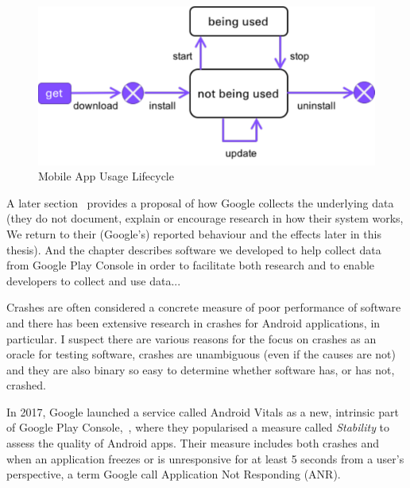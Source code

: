 
\begin{figure}
    \includegraphics[width=\linewidth]{images/mobile_app_usage_lifecycle.pdf}
    \caption{Mobile App Usage Lifecycle}
    \label{fig:mobile_app_usage_lifecycle}
\end{figure}

A later section~\href{sec:platform-level-analytics}{\emph{}} provides a proposal of how Google collects the underlying data (they do not document, explain or encourage research in how their system works, We return to their (Google's) reported behaviour and the effects later in this thesis). %
And the chapter \href{app:software-contributions}{\emph{}} describes software we developed to help collect data from Google Play Console in order to facilitate both research and to enable developers to collect and use data...

Crashes are often considered a concrete measure of poor performance of software and there has been extensive research in crashes for Android applications, in particular. I suspect there are various reasons for the focus on crashes as an oracle for testing software, crashes are unambiguous (even if the causes are not) and they are also binary so easy to determine whether software has, or has not, crashed. 

In 2017, Google launched a service called Android Vitals as a new, intrinsic part of Google Play Console,~, where they popularised a measure called \emph{Stability} to assess the quality of Android apps. Their measure includes both crashes and when an application freezes or is unresponsive for at least 5 seconds from a user's perspective, a term Google call Application Not Responding (ANR).



